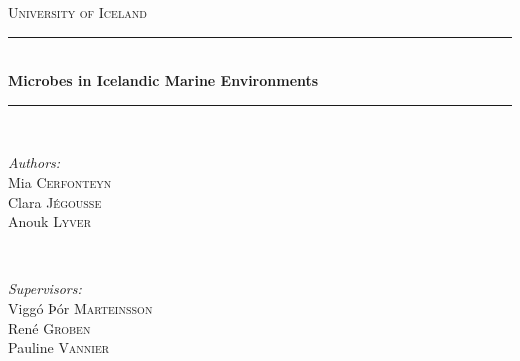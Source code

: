 

\begin{titlepage}

\newcommand{\HRule}{\rule{\linewidth}{0.5mm}} %

\centering %
 

\textsc{\LARGE University of Iceland}\\[1.5cm] %


\HRule \\[0.4cm]
{ \huge \bfseries Microbes in Icelandic Marine Environments}\\[0.4cm] %
\HRule \\[1.5cm]
 

\begin{minipage}{0.4\textwidth}
\begin{flushleft} \large
\emph{Authors:}\\
Mia \textsc{Cerfonteyn}\\
Clara \textsc{Jégousse}\\
Anouk \textsc{Lyver}\\
\end{flushleft}
\end{minipage}
~
\begin{minipage}{0.4\textwidth}
\begin{flushright} \large
\emph{Supervisors:} \\
Viggó Þór \textsc{Marteinsson}\\
René \textsc{Groben}\\
Pauline \textsc{Vannier}\\
\end{flushright}
\end{minipage}\\[4cm]


\end{titlepage}
